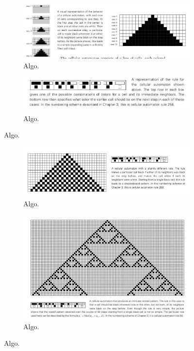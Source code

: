 \documentclass[16pt,spanish]{article}
\begin{document}
		
\begin{figure}[h!]
\begin{subfigure}[a]{0.5\linewidth}
\includegraphics[width=\linewidth]{imagesCA/Example-1-a.jpg}
\caption{Algo.}
\end{subfigure}
\begin{subfigure}[b]{0.5\linewidth}
\includegraphics[width=\linewidth]{imagesCA/Example-1-b.jpg}
\caption{Algo.}
\end{subfigure}
\end{figure}

\begin{figure}[h!]
\begin{subfigure}[c]{0.5\linewidth}
\includegraphics[width=\linewidth]{imagesCA/Example-2.jpg}
\caption{Algo.}
\end{subfigure}
\begin{subfigure}[d]{0.5\linewidth}
\includegraphics[width=0.5\linewidth]{imagesCA/Example-3.jpg}
\caption{Algo.}
\end{subfigure}
\end{figure}
\end{document}
